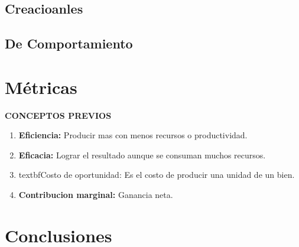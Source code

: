 \documentclass[12pt]{book}
\begin{document}
\section{Creacioanles}
\section{De Comportamiento}

\chapter{Métricas}
\textbf{CONCEPTOS PREVIOS}
\begin{enumerate}
	\item \textbf{Eficiencia:} Producir mas con menos recursos o productividad.
	\item \textbf{Eficacia:} Lograr el resultado aunque se consuman muchos recursos.
	\item textbf{Costo de oportunidad:} Es el costo de producir una unidad de un bien.
	\item \textbf{Contribucion marginal:} Ganancia neta.
\end{enumerate}

\chapter{Conclusiones}
\end{document}
